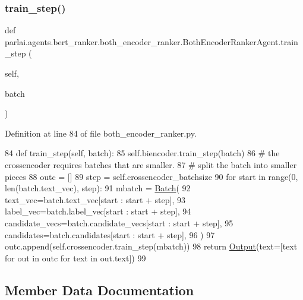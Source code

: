 \subsubsection{\texorpdfstring{train\+\_\+step()}{train\_step()}}
{\footnotesize\ttfamily def parlai.\+agents.\+bert\+\_\+ranker.\+both\+\_\+encoder\+\_\+ranker.\+Both\+Encoder\+Ranker\+Agent.\+train\+\_\+step (\begin{DoxyParamCaption}\item[{}]{self,  }\item[{}]{batch }\end{DoxyParamCaption})}



Definition at line 84 of file both\+\_\+encoder\+\_\+ranker.\+py.


\begin{DoxyCode}
84     \textcolor{keyword}{def }train\_step(self, batch):
85         self.biencoder.train\_step(batch)
86         \textcolor{comment}{# the crossencoder requires batches that are smaller.}
87         \textcolor{comment}{# split the batch into smaller pieces}
88         outc = []
89         step = self.crossencoder\_batchsize
90         \textcolor{keywordflow}{for} start \textcolor{keywordflow}{in} range(0, len(batch.text\_vec), step):
91             mbatch = \hyperlink{namespaceparlai_1_1agents_1_1legacy__agents_1_1seq2seq_1_1torch__agent__v1_a74cfde390a2b9861179ac0fcd59da28c}{Batch}(
92                 text\_vec=batch.text\_vec[start : start + step],
93                 label\_vec=batch.label\_vec[start : start + step],
94                 candidate\_vecs=batch.candidate\_vecs[start : start + step],
95                 candidates=batch.candidates[start : start + step],
96             )
97             outc.append(self.crossencoder.train\_step(mbatch))
98         \textcolor{keywordflow}{return} \hyperlink{namespaceparlai_1_1agents_1_1legacy__agents_1_1seq2seq_1_1torch__agent__v1_a2689006ea97d09413fb242f984bd8016}{Output}(text=[text \textcolor{keywordflow}{for} out \textcolor{keywordflow}{in} outc \textcolor{keywordflow}{for} text \textcolor{keywordflow}{in} out.text])
99 
\end{DoxyCode}


\subsection{Member Data Documentation}
\mbox{\label{classparlai_1_1agents_1_1bert__ranker_1_1both__encoder__ranker_1_1BothEncoderRankerAgent_a314d86777e26f7f1ab9a7b96bbaf1398}} 
